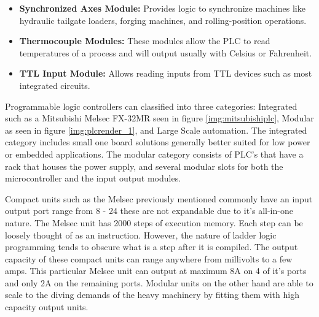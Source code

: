 \begin{itemize}
	\item \textbf{Synchronized Axes Module:} Provides logic to synchronize machines like hydraulic tailgate loaders, forging machines, and rolling-position operations.
	\item \textbf{Thermocouple Modules:} These modules allow the PLC to read temperatures of a process and will output usually with Celsius or Fahrenheit.
	\item \textbf{TTL Input Module:} Allows reading inputs from TTL devices such as most integrated circuits.
\end{itemize}

Programmable logic controllers can classified into three categories: Integrated such as a Mitsubishi Melsec FX-32MR seen in figure \ref{img:mitsubishiplc}, Modular as seen in figure \ref{img:plcrender_1}, and Large Scale automation. The integrated category includes small one board solutions generally better suited for low power or embedded applications. The modular category consists of PLC's that have a rack that houses the power supply, and several modular slots for both the microcontroller and the input output modules.

Compact units such as the Melsec previously mentioned commonly have an input output port range from 8 - 24 these are not expandable due to it's all-in-one nature. The Melsec unit has 2000 steps of execution memory. Each step can be loosely thought of as an instruction. However, the nature of ladder logic programming tends to obscure what is a step after it is compiled. The output capacity of these compact units can range anywhere from millivolts to a few amps. This particular Melsec unit can output at maximum 8A on 4 of it's ports and only 2A on the remaining ports. Modular units on the other hand are able to scale to the diving demands of the heavy machinery by fitting them with high capacity output units.

